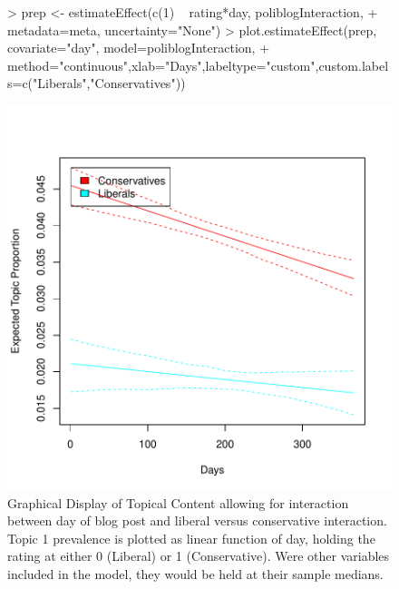\documentclass[nojss]{jss}
\begin{document}
\begin{Schunk}
\end{Schunk}

\begin{figure}[t!]
\begin{center}
\begin{Schunk}
\begin{Sinput}
> prep <- estimateEffect(c(1) ~ rating*day, poliblogInteraction,
+         metadata=meta, uncertainty="None")
> plot.estimateEffect(prep, covariate="day", model=poliblogInteraction,
+         method="continuous",xlab="Days",labeltype="custom",custom.labels=c("Liberals","Conservatives"))
\end{Sinput}
\end{Schunk}
\includegraphics{stmVignette-020}
\caption{Graphical Display of Topical Content allowing for interaction between day of blog post and liberal versus conservative interaction. Topic 1 prevalence is plotted as linear function of day, holding the rating at either 0 (Liberal) or 1 (Conservative). Were other variables included in the model, they would be held at their sample medians.}
\label{fig:spline2}
\end{center}
\end{figure}
\end{document}
